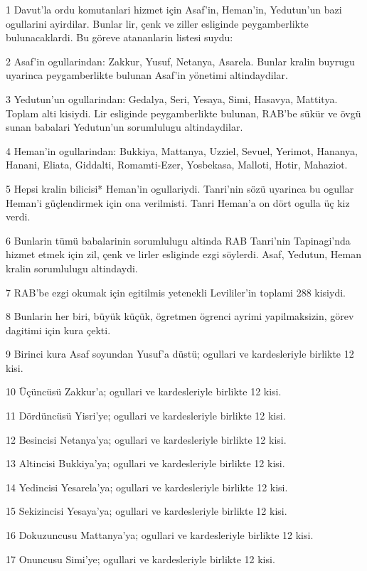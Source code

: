 \par 1 Davut'la ordu komutanlari hizmet için Asaf'in, Heman'in, Yedutun'un bazi ogullarini ayirdilar. Bunlar lir, çenk ve ziller esliginde peygamberlikte bulunacaklardi. Bu göreve atananlarin listesi suydu:
\par 2 Asaf'in ogullarindan: Zakkur, Yusuf, Netanya, Asarela. Bunlar kralin buyrugu uyarinca peygamberlikte bulunan Asaf'in yönetimi altindaydilar.
\par 3 Yedutun'un ogullarindan: Gedalya, Seri, Yesaya, Simi, Hasavya, Mattitya. Toplam alti kisiydi. Lir esliginde peygamberlikte bulunan, RAB'be sükür ve övgü sunan babalari Yedutun'un sorumlulugu altindaydilar.
\par 4 Heman'in ogullarindan: Bukkiya, Mattanya, Uzziel, Sevuel, Yerimot, Hananya, Hanani, Eliata, Giddalti, Romamti-Ezer, Yosbekasa, Malloti, Hotir, Mahaziot.
\par 5 Hepsi kralin bilicisi* Heman'in ogullariydi. Tanri'nin sözü uyarinca bu ogullar Heman'i güçlendirmek için ona verilmisti. Tanri Heman'a on dört ogulla üç kiz verdi.
\par 6 Bunlarin tümü babalarinin sorumlulugu altinda RAB Tanri'nin Tapinagi'nda hizmet etmek için zil, çenk ve lirler esliginde ezgi söylerdi. Asaf, Yedutun, Heman kralin sorumlulugu altindaydi.
\par 7 RAB'be ezgi okumak için egitilmis yetenekli Levililer'in toplami 288 kisiydi.
\par 8 Bunlarin her biri, büyük küçük, ögretmen ögrenci ayrimi yapilmaksizin, görev dagitimi için kura çekti.
\par 9 Birinci kura Asaf soyundan Yusuf'a düstü; ogullari ve kardesleriyle birlikte 12 kisi.
\par 10 Üçüncüsü Zakkur'a; ogullari ve kardesleriyle birlikte 12 kisi.
\par 11 Dördüncüsü Yisri'ye; ogullari ve kardesleriyle birlikte 12 kisi.
\par 12 Besincisi Netanya'ya; ogullari ve kardesleriyle birlikte 12 kisi.
\par 13 Altincisi Bukkiya'ya; ogullari ve kardesleriyle birlikte 12 kisi.
\par 14 Yedincisi Yesarela'ya; ogullari ve kardesleriyle birlikte 12 kisi.
\par 15 Sekizincisi Yesaya'ya; ogullari ve kardesleriyle birlikte 12 kisi.
\par 16 Dokuzuncusu Mattanya'ya; ogullari ve kardesleriyle birlikte 12 kisi.
\par 17 Onuncusu Simi'ye; ogullari ve kardesleriyle birlikte 12 kisi.
